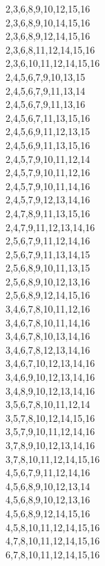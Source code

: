 \begin{center}
		2,3,6,8,9,10,12,15,16 \\
		2,3,6,8,9,10,14,15,16 \\
		2,3,6,8,9,12,14,15,16 \\
		2,3,6,8,11,12,14,15,16 \\
		2,3,6,10,11,12,14,15,16 \\
		2,4,5,6,7,9,10,13,15 \\
		2,4,5,6,7,9,11,13,14 \\
		2,4,5,6,7,9,11,13,16 \\
		2,4,5,6,7,11,13,15,16 \\
		2,4,5,6,9,11,12,13,15 \\
		2,4,5,6,9,11,13,15,16 \\
		2,4,5,7,9,10,11,12,14 \\
		2,4,5,7,9,10,11,12,16 \\
		2,4,5,7,9,10,11,14,16 \\
		2,4,5,7,9,12,13,14,16 \\
		2,4,7,8,9,11,13,15,16 \\
		2,4,7,9,11,12,13,14,16 \\
		2,5,6,7,9,11,12,14,16 \\
		2,5,6,7,9,11,13,14,15 \\
		2,5,6,8,9,10,11,13,15 \\
		2,5,6,8,9,10,12,13,16 \\
		2,5,6,8,9,12,14,15,16 \\
		3,4,6,7,8,10,11,12,16 \\
		3,4,6,7,8,10,11,14,16 \\
		3,4,6,7,8,10,13,14,16 \\
		3,4,6,7,8,12,13,14,16 \\
		3,4,6,7,10,12,13,14,16 \\
		3,4,6,9,10,12,13,14,16 \\
		3,4,8,9,10,12,13,14,16 \\
		3,5,6,7,8,10,11,12,14 \\
		3,5,7,8,10,12,14,15,16 \\
		3,5,7,9,10,11,12,14,16 \\
		3,7,8,9,10,12,13,14,16 \\
		3,7,8,10,11,12,14,15,16 \\
		4,5,6,7,9,11,12,14,16 \\
		4,5,6,8,9,10,12,13,14 \\
		4,5,6,8,9,10,12,13,16 \\
		4,5,6,8,9,12,14,15,16 \\
		4,5,8,10,11,12,14,15,16 \\
		4,7,8,10,11,12,14,15,16 \\
		6,7,8,10,11,12,14,15,16 \\
\end{center}

